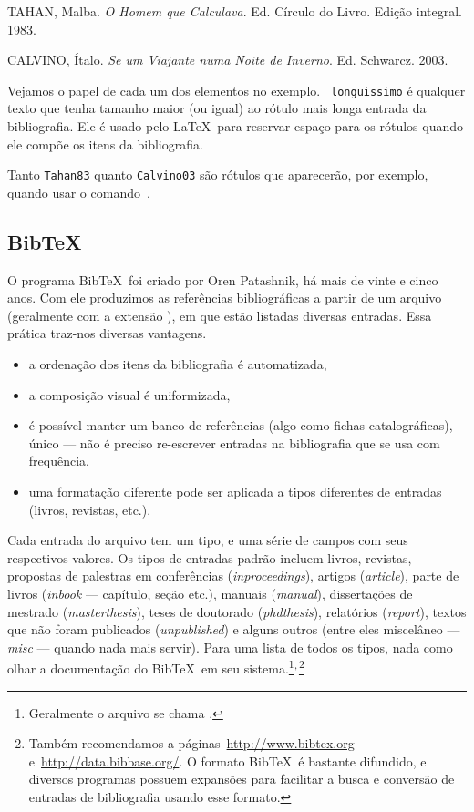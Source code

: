 \begin{thebibliography}{longuissimo}
 TAHAN, Malba. \emph{O Homem que
Calculava}. Ed. Círculo do Livro. Edição integral. 1983.

 CALVINO, Ítalo. 
\emph{Se um Viajante numa Noite de Inverno}. Ed. Schwarcz. 2003.
\end{thebibliography}

Vejamos o papel de cada um dos elementos no exemplo. {\tt
  longuissimo} é qualquer texto que tenha tamanho maior (ou igual) ao
rótulo mais longa entrada da bibliografia. Ele é usado pelo
\LaTeX\ para reservar espaço para os rótulos quando ele compõe os
itens da bibliografia.

Tanto {\tt Tahan83} quanto {\tt Calvino03} são rótulos que aparecerão,
por exemplo, quando usar o comando~.

\subsection{Bib\TeX}

O programa Bib\TeX\ foi criado por Oren Patashnik, há mais de vinte e
cinco anos. Com ele produzimos as referências bibliográficas a partir
de um arquivo (geralmente com a extensão ), em que estão
listadas diversas entradas. Essa prática traz-nos diversas vantagens.
\begin{itemize}
\item a ordenação dos itens da bibliografia é automatizada,
\item a composição visual é uniformizada,
\item é possível manter um banco de referências (algo como fichas
  catalográficas), único --- não é preciso re-escrever entradas na
  bibliografia que se usa com frequência,
\item uma formatação diferente pode ser aplicada a tipos diferentes de
  entradas (livros, revistas, etc.).
\end{itemize}


Cada entrada do arquivo 
tem um tipo, e uma série de campos com seus respectivos valores. Os
tipos de entradas padrão incluem livros, revistas, propostas de
palestras em conferências (\emph{inproceedings}), artigos
(\emph{article}), parte de livros (\emph{inbook} --- capítulo, seção
etc.), manuais (\emph{manual}), dissertações de mestrado
(\emph{masterthesis}), teses de doutorado (\emph{phdthesis}),
relatórios (\emph{report}), textos que não foram publicados
(\emph{unpublished}) e alguns outros (entre eles miscelâneo ---
\emph{misc} --- quando nada mais servir). Para uma lista de todos os
tipos, nada como olhar a documentação do Bib\TeX\ em seu
sistema.\negthinspace\footnote{Geralmente o arquivo se chama
  .}$^\textrm,$\thinspace\footnote{Também recomendamos
  a páginas~\url{http://www.bibtex.org}
  e~\url{http://data.bibbase.org/}. O formato Bib\TeX\ é bastante
  difundido, e diversos programas possuem expansões para facilitar a
  busca e conversão de entradas de bibliografia usando esse formato.}

